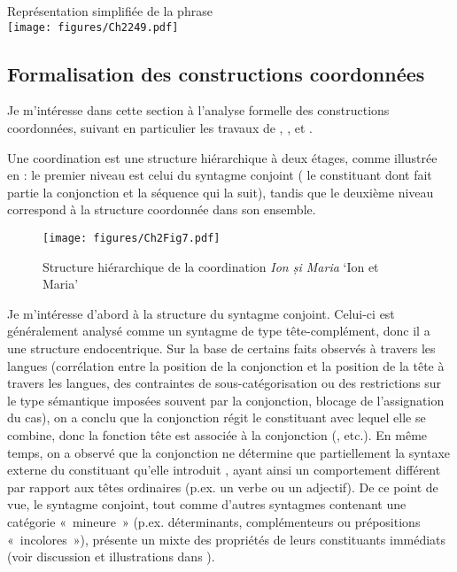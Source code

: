 \ea \label{ch2:ex249}
Représentation simplifiée de la phrase\\
\texttt{[image: figures/Ch2249.pdf]}


\z


\subsection{Formalisation des constructions coordonnées} \label{ch2:sect2.5.2}

Je m’intéresse dans cette section à l’analyse formelle des constructions coordonnées, suivant en particulier les travaux de \citet{Sag2003,Sag2005}, \citet{Abeille2003,Abeille2005}, \citet{Mouret2006,Mouret2007} et \citet{Bilbiie2008,Bilbiie2011}. 

Une coordination est une structure hiérarchique à deux étages, comme illustrée en  : le premier niveau est celui du syntagme conjoint ({\cad} le constituant dont fait partie la conjonction et la séquence qui la suit), tandis que le deuxième niveau correspond à la structure coordonnée dans son ensemble.

\begin{figure} 

   \texttt{[image: figures/Ch2Fig7.pdf]}

\caption{Structure hiérarchique de la coordination \textit{Ion și Maria} ‘Ion et Maria’}
\label{ch2:fig7}
\end{figure}

Je m’intéresse d’abord à la structure du syntagme conjoint. Celui-ci est généralement analysé comme un syntagme de type tête-complément, donc il a une structure endocentrique. Sur la base de certains faits observés à travers les langues (corrélation entre la position de la conjonction et la position de la tête à travers les langues, des contraintes de sous-catégorisation ou des restrictions sur le type sémantique imposées souvent par la conjonction, blocage de l’assignation du cas), on a conclu que la conjonction régit le constituant avec lequel elle se combine, donc la fonction tête est associée à la conjonction (\citealt{Paritong1992,Munn1993,Kayne1994,Johannessen1998}, etc.). En même temps, on a observé que la conjonction ne détermine que partiellement la syntaxe externe du constituant qu’elle introduit \citep{Paritong1992,Johannessen1998,Abeille2003,Abeille2005,Abeille2006}, ayant ainsi un comportement différent par rapport aux têtes ordinaires (p.ex. un verbe ou un adjectif). De ce point de vue, le syntagme conjoint, tout comme d’autres syntagmes contenant une catégorie «~mineure~» (p.ex. déterminants, complémenteurs ou prépositions «~incolores~»), présente un mixte des propriétés de leurs constituants immédiats (voir discussion et illustrations dans \citealt[71--73]{Mouret2007}). 

